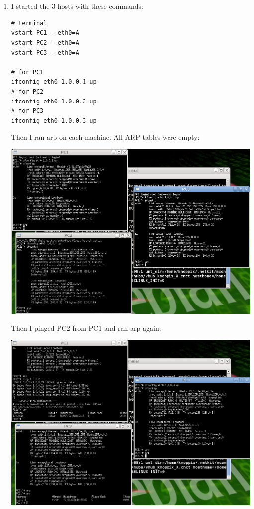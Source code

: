 \documentclass[12pt, a4paper]{article}
\begin{document}
\section{} %
\begin{enumerate}[a]
	\item %
	I started the 3 hosts with these commands:
	\begin{lstlisting}
# terminal
vstart PC1 --eth0=A
vstart PC2 --eth0=A
vstart PC3 --eth0=A

# for PC1
ifconfig eth0 1.0.0.1 up
# for PC2
ifconfig eth0 1.0.0.2 up
# for PC3
ifconfig eth0 1.0.0.3 up
	\end{lstlisting}

	Then I ran arp on each machine. All ARP tables were empty:

	\includegraphics[width=\linewidth]{screenshots/screen1}

	Then I pinged PC2 from PC1 and ran arp again:

	\includegraphics[width=\linewidth]{screenshots/screen2}


\end{enumerate}
\end{document}
